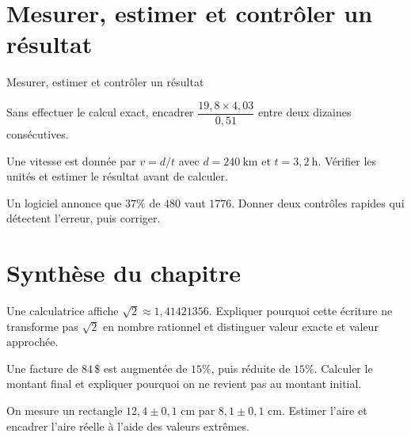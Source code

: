 \section{Mesurer, estimer et contrôler un résultat}
\label{workbook:section:01.07}
\begin{exerciseblock}{Mesurer, estimer et contrôler un résultat}
\item Sans effectuer le calcul exact, encadrer $\dfrac{19{,}8\times 4{,}03}{0{,}51}$ entre deux dizaines consécutives.
\item Une vitesse est donnée par $v=d/t$ avec $d=240\ \mathrm{km}$ et $t=3{,}2\ \mathrm h$. Vérifier les unités et estimer le résultat avant de calculer.
\item Un logiciel annonce que $37\%$ de $480$ vaut $1776$. Donner deux contrôles rapides qui détectent l'erreur, puis corriger.
\end{exerciseblock}
\section*{Synthèse du chapitre}
\begin{synthesisbox}
\item Une calculatrice affiche $\sqrt{2}\approx1{,}41421356$. Expliquer pourquoi cette écriture ne transforme pas $\sqrt2$ en nombre rationnel et distinguer valeur exacte et valeur approchée.
\item Une facture de $84\,$\$ est augmentée de $15\%$, puis réduite de $15\%$. Calculer le montant final et expliquer pourquoi on ne revient pas au montant initial.
\item On mesure un rectangle $12{,}4\pm0{,}1$ cm par $8{,}1\pm0{,}1$ cm. Estimer l'aire et encadrer l'aire réelle à l'aide des valeurs extrêmes.
\end{synthesisbox}
